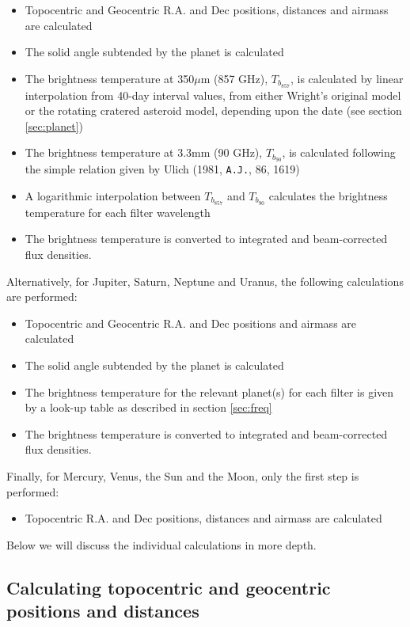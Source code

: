 \documentclass[11pt,twoside]{article}
\newcommand{\xlabel}[1]{}
\renewcommand{\_}{\texttt{\symbol{95}}}
\begin{document}
\begin{itemize}
\item{Topocentric and Geocentric R.A. and Dec positions, distances and airmass are calculated}
\item{The solid angle subtended by the planet is calculated}
\item{The brightness temperature at 350$\mu$m (857 GHz), $T_{b_{857}}$,  is calculated by linear interpolation from 40-day interval values, from either Wright's original model or the rotating cratered asteroid model, depending upon the date (see section \ref{sec:planet})}
\item{The brightness temperature at 3.3mm (90 GHz), $T_{b_{90}}$, is calculated following the simple relation given by Ulich (1981, {\tt{A.J.}}, 86, 1619)}
\item{A logarithmic interpolation between $T_{b_{857}}$ and $T_{b_{90}}$ calculates the brightness temperature for each filter wavelength}
\item{The brightness temperature is converted to integrated and beam-corrected flux densities.}
\end{itemize}

Alternatively, for Jupiter, Saturn, Neptune and Uranus, the following calculations are performed:

\begin{itemize}
\item{Topocentric and Geocentric R.A. and Dec positions and airmass are calculated}
\item{The solid angle subtended by the planet is calculated}
\item{The brightness temperature for the relevant planet(s) for each filter is given by a look-up table as described in section \ref{sec:freq}}
\item{The brightness temperature is converted to integrated and beam-corrected flux densities.}
\end{itemize}

Finally, for Mercury, Venus, the Sun and the Moon, only the first step is performed:
\begin{itemize}
\item{Topocentric R.A. and Dec positions, distances and airmass are calculated}
\end{itemize}

Below we will discuss the individual calculations in more depth.

\subsection{Calculating topocentric and geocentric positions and distances}
\xlabel{positionsdistances}
\label{sec:positionsdistances}
\end{document}
